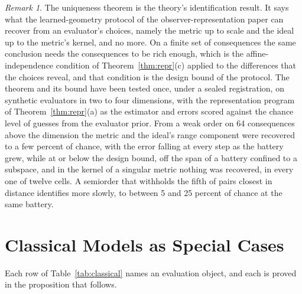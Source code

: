 \documentclass[11pt]{article}
\theoremstyle{definition}
\theoremstyle{remark}
\newtheorem*{remark}{Remark}
\begin{document}
\begin{remark}
The uniqueness theorem is the theory's identification result.
It says what the learned-geometry protocol of the observer-representation paper can recover from an evaluator's choices, namely the metric up to scale and the ideal up to the metric's kernel, and no more.
On a finite set of consequences the same conclusion needs the consequences to be rich enough, which is the affine-independence condition of Theorem~\ref{thm:repr}(c) applied to the differences that the choices reveal, and that condition is the design bound of the protocol.
The theorem and its bound have been tested once, under a sealed registration, on synthetic evaluators in two to four dimensions, with the representation program of Theorem~\ref{thm:repr}(a) as the estimator and errors scored against the chance level of guesses from the evaluator prior.
From a weak order on 64 consequences above the dimension the metric and the ideal's range component were recovered to a few percent of chance, with the error falling at every step as the battery grew, while at or below the design bound, off the span of a battery confined to a subspace, and in the kernel of a singular metric nothing was recovered, in every one of twelve cells.
A semiorder that withholds the fifth of pairs closest in distance identifies more slowly, to between 5 and 25 percent of chance at the same battery.
\end{remark}

\section{Classical Models as Special Cases}
\label{sec:classical}

Each row of Table~\ref{tab:classical} names an evaluation object, and each is proved in the proposition that follows.
\end{document}
